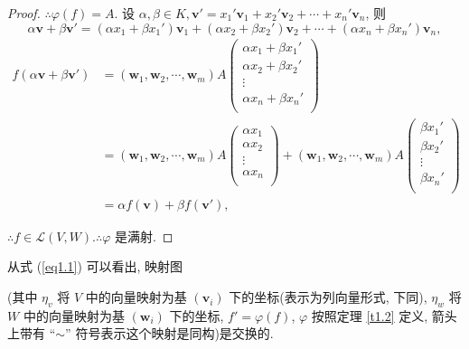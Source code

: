 \documentclass[color=black,device=normal,lang=cn,mode=geye]{elegantnote}
\begin{document}
\begin{proof}
    $\therefore\varphi(f)=A$. 设 $\alpha,\beta\in K,\boldsymbol{v}'=x_1'\boldsymbol{v}_1+x_2'\boldsymbol{v}_2+\cdots+x_n'\boldsymbol{v}_n$, 则
    \[\alpha\boldsymbol{v}+\beta\boldsymbol{v}'=(\alpha x_1+\beta x_1')\boldsymbol{v}_1+(\alpha x_2+\beta x_2')\boldsymbol{v}_2+\cdots+(\alpha x_n+\beta x_n')\boldsymbol{v}_n,\]
    \begin{align*}
        f(\alpha\boldsymbol{v}+\beta\boldsymbol{v}') & =(\boldsymbol{w}_1,\boldsymbol{w}_2,\cdots,\boldsymbol{w}_m)A\begin{pmatrix}
            \alpha x_1+\beta x_1' \\
            \alpha x_2+\beta x_2' \\
            \vdots \\
            \alpha x_n+\beta x_n' \\
        \end{pmatrix} \\
        & =(\boldsymbol{w}_1,\boldsymbol{w}_2,\cdots,\boldsymbol{w}_m)A\begin{pmatrix}
            \alpha x_1 \\
            \alpha x_2 \\
            \vdots \\
            \alpha x_n \\
        \end{pmatrix}+(\boldsymbol{w}_1,\boldsymbol{w}_2,\cdots,\boldsymbol{w}_m)A\begin{pmatrix}
            \beta x_1' \\
            \beta x_2' \\
            \vdots \\
            \beta x_n' \\
        \end{pmatrix} \\
        & =\alpha f(\boldsymbol{v})+\beta f(\boldsymbol{v}'),
    \end{align*}

    $\therefore f\in\mathcal{L}(V,W).\therefore\varphi$ 是满射.
\end{proof}

从式 (\ref{eq1.1}) 可以看出, 映射图
\begin{center}
\end{center}
(其中 $\eta_v$ 将 $V$ 中的向量映射为基 $(\boldsymbol{v}_i)$ 下的坐标(表示为列向量形式, 下同), $\eta_w$ 将 $W$ 中的向量映射为基 $(\boldsymbol{w}_i)$ 下的坐标, $f'=\varphi(f)$, $\varphi$ 按照定理 \ref{t1.2} 定义, 箭头上带有 ``$\sim$'' 符号表示这个映射是同构)是交换的.
\end{document}

